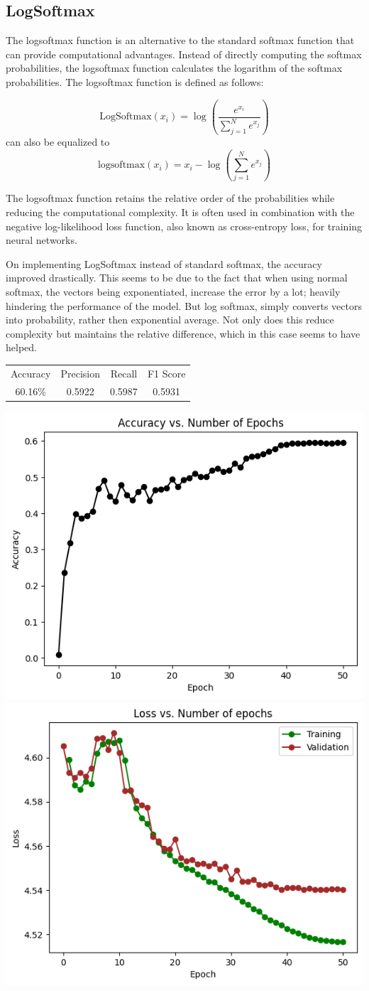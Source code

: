 \documentclass{article}
\begin{document}
\subsection{LogSoftmax}


The logsoftmax function is an alternative to the standard softmax function that can provide computational advantages. Instead of directly computing the softmax probabilities, the logsoftmax function calculates the logarithm of the softmax probabilities. The logsoftmax function is defined as follows:

\[
\text{LogSoftmax}(x_i) = \log\left(\frac{e^{x_i}}{\sum_{j=1}^N e^{x_j}}\right)
\]
can also be equalized to
\[
\text{logsoftmax}(x_i) = x_i - \log\left(\sum_{j=1}^{N}e^{x_j}\right)
\]

The logsoftmax function retains the relative order of the probabilities while reducing the computational complexity. It is often used in combination with the negative log-likelihood loss function, also known as cross-entropy loss, for training neural networks.

On implementing LogSoftmax instead of standard softmax, the accuracy improved drastically. This seems to be due to the fact that when using normal softmax, the vectors being exponentiated, increase the error by a lot; heavily hindering the performance of the model. But log softmax, simply converts vectors into probability, rather then exponential average. Not only does this reduce complexity but maintains the relative difference, which in this case seems to have helped.

\begin{center}
\begin{tabular}{ |c|c|c|c| } 
 \hline
 Accuracy & Precision & Recall & F1 Score \\ 
 60.16\% & 0.5922 & 0.5987 & 0.5931 \\
 \hline
\end{tabular}
\end{center}

        \includegraphics[width=0.5\linewidth]{images/LogSoftmax/logsoftmax-accepoch.png}
        \includegraphics[width=0.5\linewidth]{images/LogSoftmax/logsoftmax-lossepoch.png}
\end{document}
